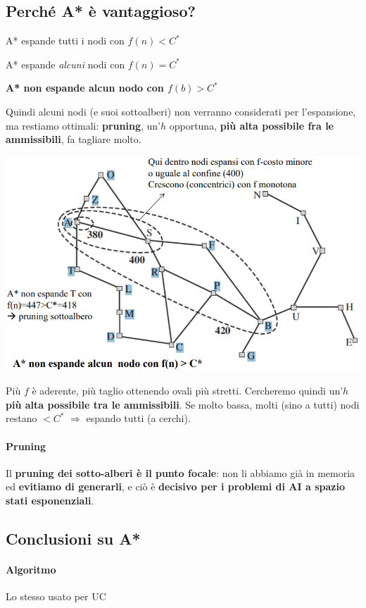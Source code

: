 \documentclass[10pt]{book}
\begin{document}
\subsection{Perché A* è vantaggioso?}
\begin{list}{}{}
	\item A* espande tutti i nodi con $f(n) < C^*$
	\item A* espande \textit{alcuni} nodi con $f(n) = C^*$
	\item \textbf{A* non espande alcun nodo con $f(b) > C^*$}
\end{list}
Quindi alcuni nodi (e suoi sottoalberi) non verranno considerati per l'espansione, ma restiamo ottimali: \textbf{pruning}, un'$h$ opportuna, \textbf{più alta possibile fra le ammissibili}, fa tagliare molto.
\pagebreak
\begin{center}
	\includegraphics[scale=0.7]{astarcontorni.png}
\end{center}
Più $f$ è aderente, più taglio ottenendo ovali più stretti. Cercheremo quindi un'$h$ \textbf{più alta possibile tra le ammissibili}. Se molto bassa, molti (sino a tutti) nodi restano $< C^*$ $\Rightarrow$ espando tutti (a cerchi).
\paragraph{Pruning} Il \textbf{pruning dei sotto-alberi è il punto focale}: non li abbiamo già in memoria ed \textbf{evitiamo di generarli}, e ciò è \textbf{decisivo per i problemi di AI a spazio stati esponenziali}.
\subsection{Conclusioni su A*}
\paragraph{Algoritmo} Lo stesso usato per UC
\end{document}
